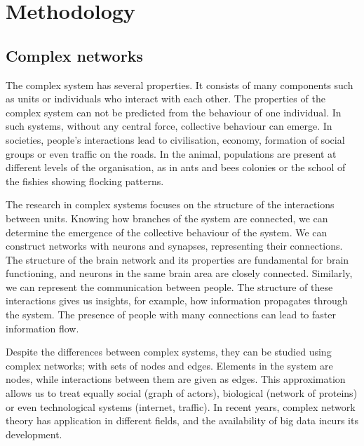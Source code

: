 \chapter{Methodology} %


\section{Complex networks}
The complex system has several properties. It consists of many components such as units or individuals who interact with each other. The properties of the complex system can not be predicted from the behaviour of one individual. In such systems, without any central force, collective behaviour can emerge. In societies, people's interactions lead to civilisation, economy, formation of social groups or even traffic on the roads. In the animal, populations are present at different levels of the organisation, as in ants and bees colonies or the school of the fishies showing flocking patterns. \cite{boccaletti2006complex}

The research in complex systems focuses on the structure of the interactions between units. Knowing how branches of the system are connected, we can determine the emergence of the collective behaviour of the system. We can construct networks with neurons and synapses, representing their connections. The structure of the brain network and its properties are fundamental for brain functioning, and neurons in the same brain area are closely connected. Similarly, we can represent the communication between people. The structure of these interactions gives us insights, for example, how information propagates through the system. The presence of people with many connections can lead to faster information flow. 

Despite the differences between complex systems, they can be studied using complex networks; with sets of nodes and edges. Elements in the system are nodes, while interactions between them are given as edges. This approximation allows us to treat equally social (graph of actors), biological (network of proteins) or even technological systems (internet, traffic). In recent years, complex network theory has application in different fields, and the availability of big data incurs its development. \\

